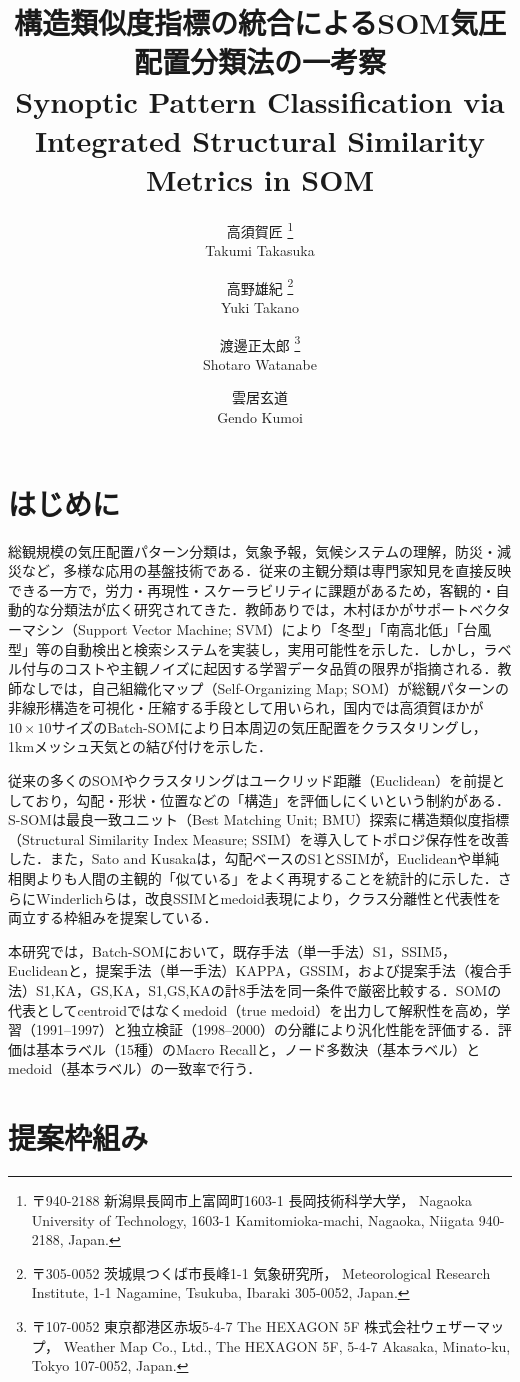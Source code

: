 \documentclass{jarticle}
\title{
  構造類似度指標の統合によるSOM気圧配置分類法の一考察\\
  Synoptic Pattern Classification via Integrated Structural Similarity Metrics in SOM
}
\author{
  高須賀匠
  \thanks{ %
    〒940-2188 新潟県長岡市上富岡町1603-1 長岡技術科学大学，
    Nagaoka University of Technology, 1603-1 Kamitomioka-machi, Nagaoka, Niigata 940-2188, Japan.
  }\\
  Takumi Takasuka
  \and
  高野雄紀
  \thanks{
    〒305-0052 茨城県つくば市長峰1-1 気象研究所，
    Meteorological Research Institute, 1-1 Nagamine, Tsukuba, Ibaraki 305-0052, Japan.
  }\\
  Yuki Takano
  \and
  渡邊正太郎
  \thanks {
    〒107-0052 東京都港区赤坂5-4-7 The HEXAGON 5F 株式会社ウェザーマップ，
    Weather Map Co., Ltd., The HEXAGON 5F, 5-4-7 Akasaka, Minato-ku, Tokyo 107-0052, Japan.
  }\\
  Shotaro Watanabe
  \and
  雲居玄道
  \footnotemark[1]\\
  Gendo Kumoi
}
\theoremstyle{definition}
\begin{document}
\maketitle

\section{はじめに}
総観規模の気圧配置パターン分類は，気象予報，気候システムの理解，防災・減災など，多様な応用の基盤技術である．従来の主観分類は専門家知見を直接反映できる一方で，労力・再現性・スケーラビリティに課題があるため，客観的・自動的な分類法が広く研究されてきた．教師ありでは，木村ほか\cite{木村広希2009サポートベクターマシンを用いた気圧配置検出手法の提案}がサポートベクターマシン（Support Vector Machine; SVM）により「冬型」「南高北低」「台風型」等の自動検出と検索システムを実装し，実用可能性を示した．しかし，ラベル付与のコストや主観ノイズに起因する学習データ品質の限界が指摘される．教師なしでは，自己組織化マップ（Self-Organizing Map; SOM）が総観パターンの非線形構造を可視化・圧縮する手段として用いられ\cite{philippopoulos2014performance,jiang2013classification}，国内では高須賀ほか\cite{takasuka2024}が$10\times 10$サイズのBatch-SOMにより日本周辺の気圧配置をクラスタリングし，1kmメッシュ天気との結び付けを示した．

従来の多くのSOMやクラスタリングはユークリッド距離（Euclidean）を前提としており，勾配・形状・位置などの「構造」を評価しにくいという制約がある．S-SOM\cite{doan2021s}は最良一致ユニット（Best Matching Unit; BMU）探索に構造類似度指標（Structural Similarity Index Measure; SSIM）を導入してトポロジ保存性を改善した．また，Sato and Kusaka\cite{SATOTakuto20212021-047}は，勾配ベースのS1とSSIMが，Euclideanや単純相関よりも人間の主観的「似ている」をよく再現することを統計的に示した．さらにWinderlichら\cite{winderlich2024classification}は，改良SSIMとmedoid表現により，クラス分離性と代表性を両立する枠組みを提案している．

本研究では，Batch-SOMにおいて，既存手法（単一手法）S1，SSIM5，Euclideanと，提案手法（単一手法）KAPPA，GSSIM，および提案手法（複合手法）S1,KA，GS,KA，S1,GS,KAの計8手法を同一条件で厳密比較する．SOMの代表としてcentroidではなくmedoid（true medoid）を出力して解釈性を高め，学習（1991–1997）と独立検証（1998–2000）の分離により汎化性能を評価する．評価は基本ラベル（15種）のMacro Recallと，ノード多数決（基本ラベル）とmedoid（基本ラベル）の一致率で行う．

\section{提案枠組み}
\end{document}
